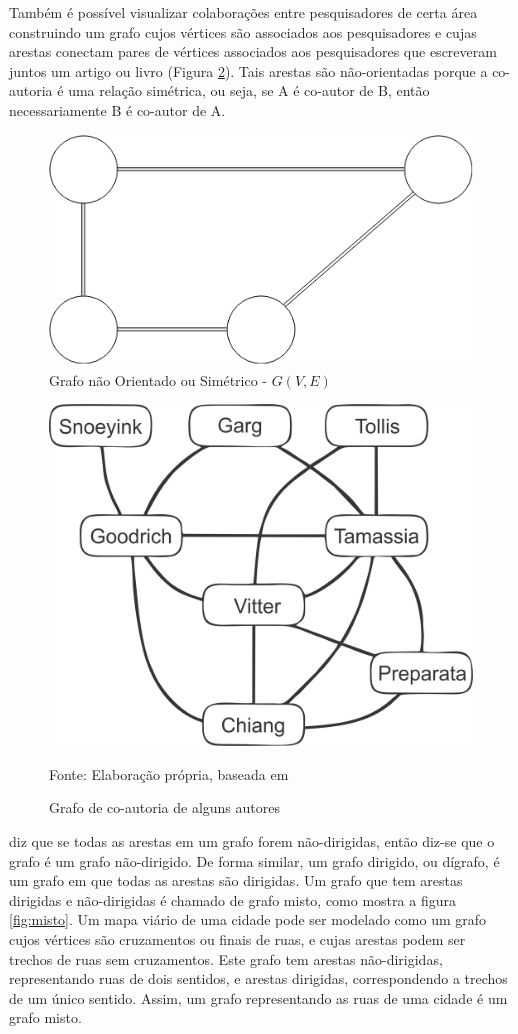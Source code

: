 Também é possível visualizar colaborações entre pesquisadores de certa área construindo um grafo cujos vértices são
associados aos pesquisadores e cujas arestas conectam pares de vértices associados aos pesquisadores
que escreveram juntos um artigo ou livro (Figura \ref{fig:goodrich}). Tais arestas são não-orientadas porque
a co-autoria é uma relação simétrica, ou seja, se A é co-autor de B, então necessariamente B é co-autor de A.

\begin{figure}[htbp]
\centering
 \includegraphics[width=.55\textwidth]{chapters/fig/simetrico1.png}
\caption{Grafo não Orientado ou Simétrico - $G(V,E)$}
\label{fig:simetrico}
\end{figure}

\begin{figure}[htbp]
\centering
 \includegraphics[width=.55\textwidth]{chapters/fig/goodrich.png}
\caption{Grafo de co-autoria de alguns autores}
Fonte: Elaboração própria, baseada em \cite{goodrich}
\label{fig:goodrich}
\end{figure}


\pagebreak

\cite{goodrich} diz que se todas as arestas em um grafo forem não-dirigidas,
então diz-se que o grafo é um grafo não-dirigido. De forma similar, um grafo dirigido, ou dígrafo, é um grafo em
que todas as arestas são dirigidas. Um grafo que tem arestas dirigidas e não-dirigidas é chamado de grafo misto, 
como mostra a figura \ref{fig:misto}.
Um mapa viário de uma cidade pode ser modelado como um grafo cujos vértices são cruzamentos ou finais de ruas, e cujas arestas
podem ser trechos de ruas sem cruzamentos. Este grafo tem arestas não-dirigidas, representando ruas de dois sentidos,
e arestas dirigidas, correspondendo a trechos de um único sentido. Assim, um grafo representando as ruas de uma cidade
é um grafo misto.

